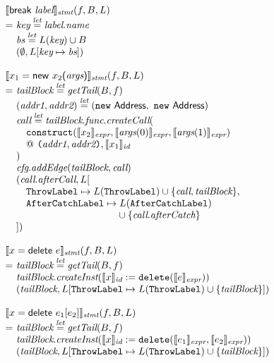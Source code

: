 \[
\begin{array}{l@{}l@{~}l}
\lefteqn{\transfun{{\sf break}\ \emph{label}}_{\emph{stmt}}(f, B, L)}\\
& = & \emph{key} \letval \emph{label}.\emph{name}\\
& & \emph{bs} \letval L(\emph{key}) \cup B\\
& & (\emptyset, L[\emph{key} \mapsto \emph{bs}])\\
& & \\

\lefteqn{\transfun{\ircfgnew{x_1}{{\sf new}\ x_2}{\emph{args}}}_{\emph{stmt}}(f, B, L)}\\
& = & \emph{tailBlock} \letval \getTail(B, f)\\
& & (\emph{addr1}, \emph{addr2}) \letval (\new\ \Address,\ \new\ \Address) \\
& & \emph{call} \letval \emph{tailBlock}.\emph{func}.\emph{createCall}(\\
& & \quad \TT{construct}(\transfun{x_2}_{\emph{expr}}, \transfun{\emph{args}(0)}_{\emph{expr}}, \transfun{\emph{args}(1)}_{\emph{expr}})\\
& & \phantom{\quad }
@~ \TT{(}\emph{addr1}, \emph{addr2}\TT{)}, \transfun{x_1}_{\emph{id}}\\
& & )\\
& & \emph{cfg}.\emph{addEdge}(\emph{tailBlock}, \emph{call})\\
& & (\emph{call}.\emph{afterCall}, L[\\
& & \quad \ThrowLabel \mapsto L(\ThrowLabel) \cup \{ \emph{call}, \emph{tailBlock} \},\\
& & \quad \AfterCatchLabel \mapsto L(\AfterCatchLabel)\\
& & \phantom{\quad \AfterCatchLabel \mapsto}
\cup \{ \emph{call}.\emph{afterCatch} \}\\
& & ])\\
& & \\

\lefteqn{\transfun{\irdelete{x}{e}}_{\emph{stmt}}(f, B, L)}\\
& = & \emph{tailBlock} \letval \getTail(B, f)\\
& & \emph{tailBlock}.\emph{createInst}(\transfun{x}_{\emph{id}} := \TT{delete}(\transfun{e}_{\emph{expr}}))\\
& & (\emph{tailBlock}, L[\ThrowLabel \mapsto L(\ThrowLabel) \cup \{ \emph{tailBlock} \}])\\
& & \\

\lefteqn{\transfun{\irdeleteobj{x}{e_1}{e_2}}_{\emph{stmt}}(f, B, L)}\\
& = & \emph{tailBlock} \letval \getTail(B, f)\\
& & \emph{tailBlock}.\emph{createInst}(\transfun{x}_{\emph{id}} := \TT{delete}(\transfun{e_1}_{\emph{expr}}, \transfun{e_2}_{\emph{expr}}))\\
& & (\emph{tailBlock}, L[\ThrowLabel \mapsto L(\ThrowLabel) \cup \{ \emph{tailBlock} \}])\\
& & \\


\end{array}\]
